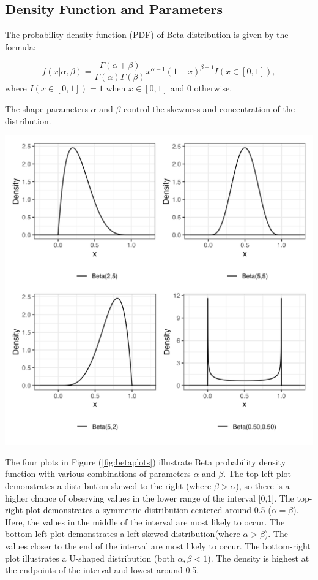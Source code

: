 \documentclass{article}\usepackage[]{graphicx}\usepackage[]{xcolor}
\newenvironment{Figure}
  {\par\medskip\noindent\minipage{\linewidth}}
  {\endminipage\par\medskip}
\begin{document}
\begin{multicols}{2}
\section{Density Function and Parameters}\label{sec:pdf}
The probability density function (PDF) of Beta distribution is given by the formula:

\[
 f(x | \alpha, \beta) = \frac{\Gamma(\alpha + \beta)}{\Gamma(\alpha)\Gamma(\beta)} x^{\alpha-1}(1-x)^{\beta-1} I(x \in [0,1]),
\]
where $I(x \in [0,1]) = 1$ when $x \in [0,1]$ and 0 otherwise.

The shape parameters $\alpha$ and $\beta$ control the skewness and concentration of the distribution.


\begin{Figure}
 \centering
 \includegraphics[width=\linewidth]{betaplots.png}
 \label{fig:betaplots}
\end{Figure}

The four plots in Figure (\ref{fig:betaplots}) illustrate Beta probability density function with various combinations of parameters $\alpha$ and $\beta$. The top-left plot demonstrates a distribution skewed to the right (where $\beta > \alpha$), so there is a higher chance of observing values in the lower range of the interval [0,1]. The top-right plot demonstrates a symmetric distribution centered around 0.5 ($\alpha = \beta$). Here, the values in the middle of the interval are most likely to occur. The bottom-left plot demonstrates a left-skewed distribution(where $\alpha > \beta$). The values closer to the end of the interval are most likely to occur. The bottom-right plot illustrates a U-shaped distribution (both $\alpha, \beta < 1$). The density is highest at the endpoints of the interval and lowest around 0.5.



\end{multicols}
\end{document}
